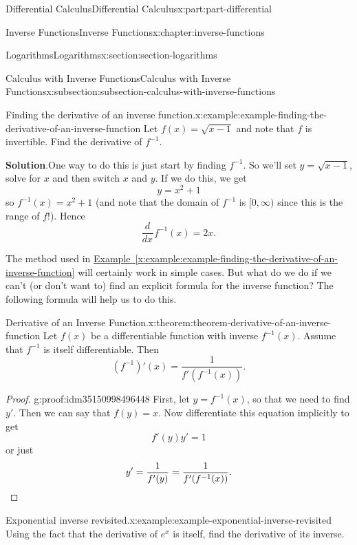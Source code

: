\documentclass[twoside,10pt,]{tufte-book}
\newcommand{\blocktitlefont}{\relax}
\newcommand{\xreffont}{\relax}
\numberwithin{equation}{part}
\newcommand{\qedhere}{\relax}
\newcommand{\dv}[3][]{\dfrac{d^{#1} #2}{d #3^{#1}}}
\begin{document}
\begin{partptx}{Differential Calculus}{}{Differential Calculus}{}{}{x:part:part-differential}
\begin{chapterptx}{Inverse Functions}{}{Inverse Functions}{}{}{x:chapter:inverse-functions}
\begin{sectionptx}{Logarithms}{}{Logarithms}{}{}{x:section:section-logarithms}
\begin{subsectionptx}{Calculus with Inverse Functions}{}{Calculus with Inverse Functions}{}{}{x:subsection:subsection-calculus-with-inverse-functions}
\begin{example}{Finding the derivative of an inverse function.}{x:example:example-finding-the-derivative-of-an-inverse-function}
Let \(f(x) = \sqrt{x-1}\) and note that \(f\) is invertible. Find the derivative of \(f^{-1}\).%
\par\smallskip%
\noindent\textbf{\blocktitlefont Solution}.\hypertarget{g:solution:idm35150998439488}{}\quad{}One way to do this is just start by finding \(f^{-1}\). So we'll set \(y = \sqrt{x-1}\), solve for \(x\) and then switch \(x\) and \(y\). If we do this, we get%
\begin{equation*}
y = x^{2} + 1
\end{equation*}
so \(f^{-1}(x) = x^{2} + 1\) (and note that the domain of \(f^{-1}\) is \([0,\infty)\) since this is the range of \(f\)!). Hence%
\begin{equation*}
\dv{}{x}f^{-1}(x) = 2x.
\end{equation*}
%
\end{example}
The method used in \hyperref[x:example:example-finding-the-derivative-of-an-inverse-function]{Example~{\xreffont\ref{x:example:example-finding-the-derivative-of-an-inverse-function}}} will certainly work in simple cases. But what do we do if we can't (or don't want to) find an explicit formula for the inverse function? The following formula will help us to do this.%
\begin{theorem}{Derivative of an Inverse Function.}{}{x:theorem:theorem-derivative-of-an-inverse-function}%
%
Let \(f(x)\) be a differentiable function with inverse \(f^{-1}(x)\). Assume that \(f^{-1}\) is itself differentiable. Then%
\begin{equation*}
(f^{-1})'(x) = \frac{1}{f'(f^{-1}(x))}.
\end{equation*}
%
\end{theorem}
\begin{proof}{}{g:proof:idm35150998496448}
First, let \(y = f^{-1}(x)\), so that we need to find \(y'\). Then we can say that \(f(y) = x\). Now differentiate this equation implicitly to get%
\begin{equation*}
f'(y)y' = 1
\end{equation*}
or just%
\begin{equation*}
y' = \frac{1}{f'(y)} = \frac{1}{f'(f^{-1}(x))}.\qedhere
\end{equation*}
%
\end{proof}
\begin{example}{Exponential inverse revisited.}{x:example:example-exponential-inverse-revisited}%
Using the fact that the derivative of \(e^{x}\) is itself, find the derivative of its inverse.%
\par\smallskip%

\end{example}
\end{subsectionptx}
\end{sectionptx}
\end{chapterptx}
\end{partptx}
\end{document}
